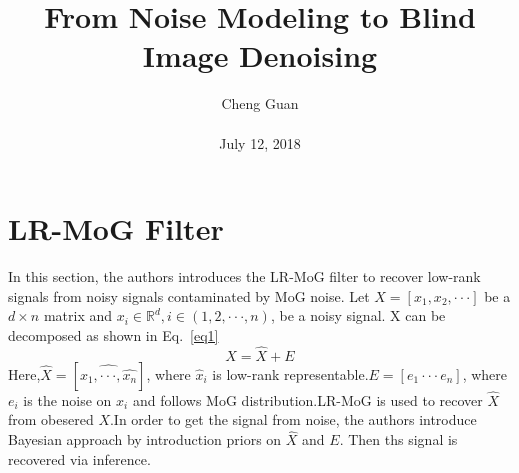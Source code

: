 \documentclass[10pt,twocolumn,letterpaper]{article}
\title{From Noise Modeling to Blind Image Denoising}
\author{Cheng Guan\\\\
July 12, 2018}
\begin{document}
\maketitle
\section{LR-MoG Filter}
In this section, the authors introduces the LR-MoG filter to
recover low-rank signals from noisy signals contaminated by
MoG noise. Let $X=\left[x_1,x_2,\cdot\cdot\cdot\right]$ be a
$d\times n$ matrix and $x_i \in \mathbb{R}^d,i\in \left(1,2,\cdot\cdot\cdot,n\right)$, be a noisy signal. X can be
decomposed as shown in Eq.~\ref{eq1}
\begin{equation}
 X = \hat{X} + E
\label{eq1}
\end{equation}
Here,$\hat{X}=\left[\hat{x_1,\cdot\cdot\cdot,\hat{x_n}}\right]$, 
where $\hat{x}_i$ is low-rank representable.$E=\left[e_1\cdot\cdot\cdot e_n\right]$, 
where $e_i$ is the noise on $x_i$ and follows MoG distribution.LR-MoG is 
used to recover $\hat{X}$ from obesered $X$.In order to get the signal 
from noise, the authors introduce Bayesian approach by introduction 
priors on $\hat{X}$ and $E$. Then ths signal is recovered via inference.
\end{document}
